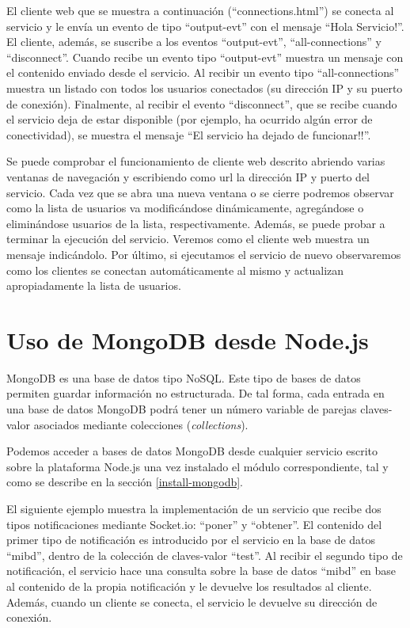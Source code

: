 \documentclass[12pt, a4paper, spanish]{scrartcl}
\begin{document}


El cliente web que se muestra a continuación (``connections.html'') se conecta al servicio y le envía un evento de tipo ``output-evt'' con el mensaje ``Hola Servicio!''. El cliente, además, se suscribe a los eventos ``output-evt'', ``all-connections'' y ``disconnect''. Cuando recibe un evento tipo ``output-evt'' muestra un mensaje con el contenido enviado desde el servicio. Al recibir un evento tipo ``all-connections'' muestra un listado con todos los usuarios conectados (su dirección IP y su puerto de conexión). Finalmente, al recibir el evento ``disconnect'', que se recibe cuando el servicio deja de estar disponible (por ejemplo, ha ocurrido algún error de conectividad), se muestra el mensaje ``El servicio ha dejado de funcionar!!''.



Se puede comprobar el funcionamiento de cliente web descrito abriendo varias ventanas de navegación y escribiendo como url la dirección IP y puerto del servicio. Cada vez que se abra una nueva ventana o se cierre podremos observar como la lista de usuarios va modificándose dinámicamente, agregándose o eliminándose usuarios de la lista, respectivamente. Además, se puede probar a terminar la ejecución del servicio. Veremos como el cliente web muestra un mensaje indicándolo. Por último, si ejecutamos el servicio de nuevo observaremos como los clientes se conectan automáticamente al mismo y actualizan apropiadamente la lista de usuarios.

\section{Uso de MongoDB desde Node.js}

MongoDB es una base de datos tipo NoSQL. Este tipo de bases de datos permiten guardar información no estructurada. De tal forma, cada entrada en una base de datos MongoDB podrá tener un número variable de parejas claves-valor asociados mediante colecciones (\emph{collections}).

Podemos acceder a bases de datos MongoDB desde cualquier servicio escrito sobre la plataforma Node.js una vez instalado el módulo correspondiente, tal y como se describe en la sección \ref{install-mongodb}.

El siguiente ejemplo muestra la implementación de un servicio que recibe dos tipos notificaciones mediante Socket.io: ``poner'' y ``obtener''. El contenido del primer tipo de notificación es introducido por el servicio en la base de datos ``mibd'', dentro de la colección de claves-valor ``test''. Al recibir el segundo tipo de notificación, el servicio hace una consulta sobre la base de datos ``mibd'' en base al contenido de la propia notificación y le devuelve los resultados al cliente. Además, cuando un cliente se conecta, el servicio le devuelve su dirección de conexión.
\end{document}
